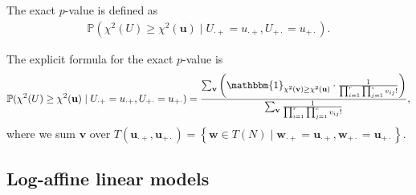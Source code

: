 \begin{mdframed}  
\begin{defi}
  The exact \( p \)-value is defined as
  \begin{align*}
    \mathbb{P}(\chi^2(U) \geq \chi^2(\mathbf u) \mid U_{\cdot +} = u_{\cdot +}, U_{+\cdot} = u_{+ \cdot}).
  \end{align*}
\end{defi}
\end{mdframed}

\begin{prop}
  The explicit formula for the exact \( p \)-value is 
  \begin{align*}
    \mathbb{P}(\chi^2(U) \geq \chi^2(\mathbf u) \mid U_{\cdot +} = u_{\cdot +}, U_{+\cdot} = u_{+ \cdot}) = \frac{\sum_{\mathbf v} \left(\mathbbm{1}_{\chi^2(\mathbf v) \geq \chi^2(\mathbf u)} \cdot \frac{1}{\prod^r_{i=1} \prod^c_{j=1} v_{ij}!}\right)}{\sum_{\mathbf v} \frac{1}{\prod^r_{i=1} \prod^c_{j=1} v_{ij}!}},
  \end{align*}
  where we sum \( \mathbf{v} \) over \( T(\mathbf u_{\cdot+}, \mathbf u_{+\cdot}) = \left\{ \mathbf w \in T(N) \mid \mathbf{w}_{\cdot+} = \mathbf{u}_{\cdot +}, \mathbf{w}_{+\cdot} = \mathbf{u}_{+\cdot} \right\} \).
\end{prop}


\subsection{Log-affine linear models}


